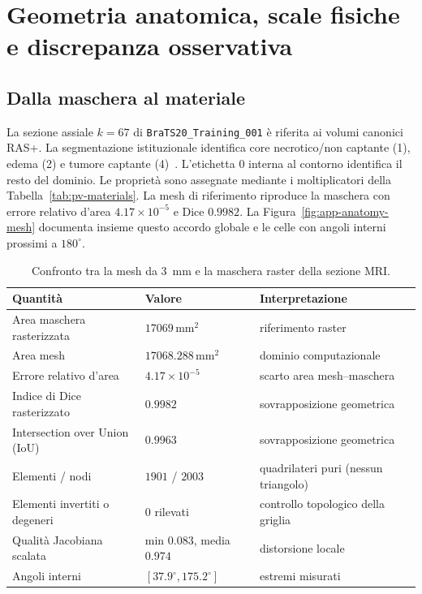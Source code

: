 \section{Geometria anatomica, scale fisiche e discrepanza osservativa}
\label{app:anatomy}
\setcounter{figure}{0}\setcounter{table}{0}\setcounter{equation}{0}

\subsection{Dalla maschera al materiale}
La sezione assiale $k=67$ di \texttt{BraTS20\_Training\_001} è riferita ai volumi canonici RAS+. La segmentazione istituzionale identifica core necrotico/non captante (1), edema (2) e tumore captante (4)~\citep{brats2020protocol}. L'etichetta 0 interna al contorno identifica il resto del dominio. Le proprietà sono assegnate mediante i moltiplicatori della Tabella~\ref{tab:pv-materials}. La mesh di riferimento riproduce la maschera con errore relativo d'area $4.17\times10^{-5}$ e Dice $0.9982$. La Figura~\ref{fig:app-anatomy-mesh} documenta insieme questo accordo globale e le celle con angoli interni prossimi a $180^\circ$.

\begin{table}[H]
\centering
\caption{Confronto tra la mesh da 3~mm e la maschera raster della sezione MRI.}
\label{tab:app-geometry}
\small
\setlength{\tabcolsep}{8pt}
\begin{tabular}{@{}p{}p{}p{}@{}}
\toprule
Quantità & Valore & Interpretazione \\
\midrule
Area maschera rasterizzata      & $17069\,\mathrm{mm}^2$     & riferimento raster \\
Area mesh                       & $17068.288\,\mathrm{mm}^2$ & dominio computazionale \\
Errore relativo d'area          & $4.17\times10^{-5}$        & scarto area mesh--maschera \\
Indice di Dice rasterizzato     & $0.9982$                   & sovrapposizione geometrica \\
Intersection over Union (IoU)   & $0.9963$                   & sovrapposizione geometrica \\
Elementi / nodi                 & $1901$ / $2003$            & quadrilateri puri (nessun triangolo) \\
Elementi invertiti o degeneri   & $0$ rilevati               & controllo topologico della griglia \\
Qualità Jacobiana scalata       & min $0.083$, media $0.974$ & distorsione locale \\
Angoli interni                 & $[37.9^\circ,175.2^\circ]$ & estremi misurati \\
\bottomrule
\end{tabular}
\end{table}

